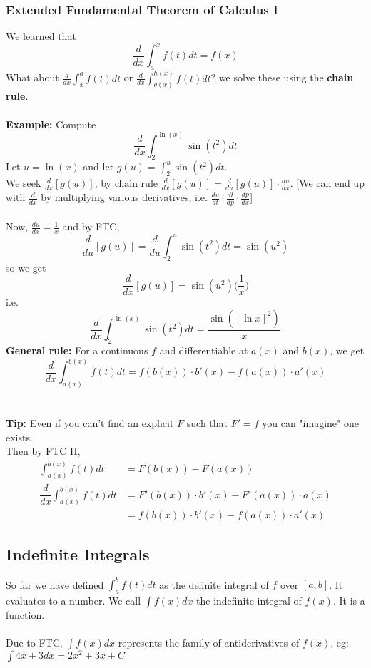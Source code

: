 \documentclass[10pt]{article}
\theoremstyle{break}
\begin{document}
\subsubsection{Extended Fundamental Theorem of Calculus I}
We learned that $$\dfrac{d}{dx}\int^x_a f(t) dt = f(x)$$
What about $\frac{d}{dx} \int^a_x f(t) dt$ or $\frac{d}{dx} \int^{h(x)}_{g(x)} f(t) dt$? we solve these using the \textbf{chain rule}. \\ \; \\
\textbf{Example:} Compute $$\dfrac{d}{dx}\int^{\ln(x)}_{2} \sin(t^2) dt$$
Let $u = \ln(x)$ and let $g(u) = \int^u_2 \sin(t^2) dt$. \\
We seek $\frac{d}{dx}[g(u)]$, by chain rule $\frac{d}{dx}[g(u)] = \frac{d}{du}[g(u)] \cdot \frac{du}{dx}$. [We can end up with $\frac{d}{dx}$ by multiplying various derivatives, i.e. $\frac{du}{dt} \cdot \frac{dt}{dp} \cdot \frac{dp}{dx}$]\\ \: \\
Now, $\frac{du}{dx} = \frac{1}{x}$ and by FTC, $$\frac{d}{du}[g(u)] = \frac{d}{du} \int^u_2 \sin(t^2) dt = \sin(u^2)$$
so we get $$\frac{d}{dx}[g(u)] = \sin(u^2)\bigg(\frac{1}{x}\bigg)$$
i.e. $$\frac{d}{dx}\int^{\ln(x)}_{2} \sin(t^2) dt = \dfrac{\sin([\ln x]^2)}{x}$$ 
\textbf{General rule:} For a continuous $f$ and differentiable at $a(x)$ and $b(x)$, we get $$\dfrac{d}{dx} \int^{b(x)}_{a(x)} f(t) dt = f(b(x)) \cdot b'(x) - f(a(x)) \cdot a'(x)$$\\ \: \\
\textbf{Tip:}  Even if you can't find an explicit $F$ such that $F' = f$ you can "imagine" one exists. \\
Then by FTC II,
\begin{align*}
  \int^{b(x)}_{a(x)} f(t) dt &= F(b(x)) - F(a(x)) \\
  \dfrac{d}{dx} \int^{b(x)}_{a(x)} f(t) dt &= F'(b(x)) \cdot b'(x) - F'(a(x)) \cdot a(x)\\
  &= f(b(x)) \cdot b'(x) - f(a(x)) \cdot a'(x)
\end{align*}
\subsection{Indefinite Integrals}
So far we have defined $\int^b_a f(t) dt$ as the definite integral of $f$ over $[a, b]$. It evaluates to a number.
We call $\int f(x) dx$ the indefinite integral of $f(x)$. It is a function.
\\ \vspace{0.5ex} \\
Due to FTC, $\int f(x) dx$ represents the family of antiderivatives of $f(x)$. eg: $\int 4x + 3 dx = 2x^2 + 3x + C$
\end{document}
